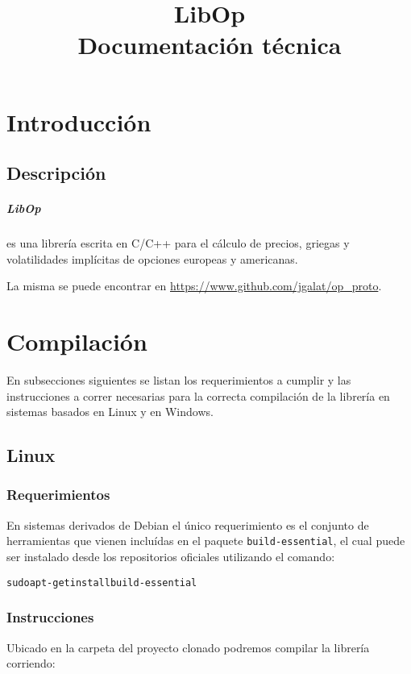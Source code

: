 \documentclass[12pt,a4paper,final]{article}
\author{}
\title{LibOp \\ Documentación técnica}
\date{}
\begin{document}
\maketitle

\tableofcontents

\clearpage

\section{Introducción}


\subsection{Descripción}
	\subparagraph{LibOp} es una librería escrita en C/C++ para el cálculo de
	precios, griegas y volatilidades implícitas de opciones europeas y americanas.

	La misma se puede encontrar en \newline{} \url{https://www.github.com/jgalat/op\_proto}.

\section{Compilación}
	En subsecciones siguientes se listan los requerimientos a cumplir y las instrucciones
	a correr necesarias para la correcta compilación de la librería en sistemas basados
	en Linux y en Windows.

	\subsection{Linux}

		\subsubsection{Requerimientos}
			En sistemas derivados de Debian el único requerimiento es el conjunto de
			herramientas que vienen incluídas en el paquete \texttt{build-essential},
			el cual puede ser instalado desde los repositorios
			oficiales utilizando el comando:

			\begin{alltt}
				sudo apt-get install build-essential
			\end{alltt}

		\subsubsection{Instrucciones}
			Ubicado en la carpeta del proyecto clonado podremos compilar la librería corriendo:
\end{document}
